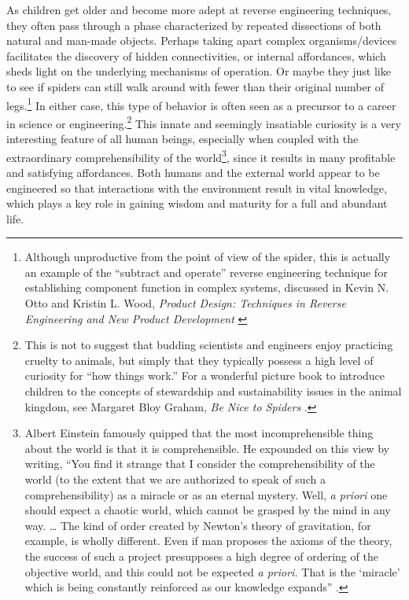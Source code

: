 As children get older and become more adept at reverse engineering
techniques, they often pass through a phase characterized by repeated
dissections of both natural and man-made objects. Perhaps taking apart
complex organisms/devices facilitates the discovery of hidden
connectivities, or internal affordances, which sheds light on the
underlying mechanisms of operation. Or maybe they just like to see if
spiders can still walk around with fewer than their original number of
legs.\footnote{Although unproductive from the point of view of the
spider, this is actually an example of the “subtract and operate”
reverse engineering technique for establishing component function in
complex systems, discussed in Kevin N. Otto and Kristin L. Wood,
\textit{Product Design: Techniques in Reverse Engineering and New Product Development} \citep[][pp. 159--162, 204--211]{ottowood2001}}
In either case, this type of behavior is often
seen as a precursor to a career in science or
engineering.\footnote{%
This is not to suggest that budding scientists and
engineers enjoy practicing cruelty to animals, but simply that they
typically possess a high level of curiosity for “how things work.” For
a wonderful picture book to introduce children to the concepts of
stewardship and sustainability issues in the animal kingdom, see
Margaret Bloy Graham, \textit{Be Nice to Spiders} \citep{graham1967}.
}
This innate and seemingly insatiable
curiosity is a very interesting feature of all human beings, especially
when coupled with the extraordinary comprehensibility of the
world\footnote{%
Albert Einstein famously quipped that the most
incomprehensible thing about the world is that it is comprehensible. He
expounded on this view by writing, ``You find it strange that I consider
the comprehensibility of the world (to the extent that we are
authorized to speak of such a comprehensibility) as a miracle or as an
eternal mystery. Well, \textit{a priori} one should expect a chaotic
world, which cannot be grasped by the mind in any way. {\ldots} The
kind of order created by Newton's theory of
gravitation, for example, is wholly different. Even if man proposes the
axioms of the theory, the success of such a project presupposes a high
degree of ordering of the objective world, and this could not be
expected \textit{a priori.} That is the
`miracle' which is being constantly
reinforced as our knowledge expands'' \citep[][p.~131]{einstein1987}.
}, since it results in many profitable and
satisfying affordances. Both humans and the external world appear to be
engineered so that interactions with the environment result in vital
knowledge, which plays a key role in gaining wisdom and maturity for a
full and abundant life.  %

